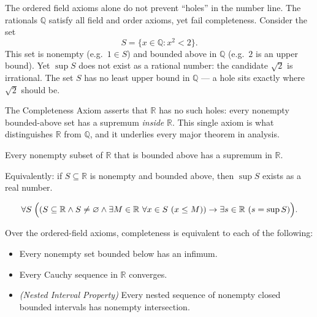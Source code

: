 \begin{remark*}
The ordered field axioms alone do not prevent ``holes'' in the number line.
The rationals $\mathbb{Q}$ satisfy all field and order axioms, yet fail
completeness. Consider the set
\[
S = \{x \in \mathbb{Q} : x^2 < 2\}.
\]
This set is nonempty (e.g.\ $1 \in S$) and bounded above in $\mathbb{Q}$
(e.g.\ $2$ is an upper bound). Yet $\sup S$ does not exist as a rational
number: the candidate $\sqrt{2}$ is irrational. The set $S$ has no least
upper bound in $\mathbb{Q}$ --- a hole sits exactly where $\sqrt{2}$ should be.

The Completeness Axiom asserts that $\mathbb{R}$ has no such holes:
every nonempty bounded-above set has a supremum \emph{inside} $\mathbb{R}$.
This single axiom is what distinguishes $\mathbb{R}$ from $\mathbb{Q}$,
and it underlies every major theorem in analysis.
\end{remark*}

\begin{tcolorbox}[colback=axiombox, colframe=axiomborder, arc=2pt,
  left=6pt, right=6pt, top=4pt, bottom=4pt,
  title={\small\textbf{Axiom (Completeness Axiom (Least Upper Bound Property))}},
  fonttitle=\small\bfseries]
Every nonempty subset of $\mathbb{R}$ that is bounded above has a supremum
in $\mathbb{R}$.

Equivalently: if $S \subseteq \mathbb{R}$ is nonempty and bounded above,
then $\sup S$ exists as a real number.
\end{tcolorbox}

\begin{remark*}
\[
\forall S\;\Bigl(
(S \subseteq \mathbb{R} \wedge S \neq \varnothing \wedge
\exists M \in \mathbb{R}\ \forall x \in S\ (x \le M))
\rightarrow
\exists s \in \mathbb{R}\ (s = \sup S)
\Bigr).
\]
\end{remark*}

\begin{remark*}
Over the ordered-field axioms, completeness is equivalent to each of the
following:
\begin{itemize}
  \item Every nonempty set bounded below has an infimum.
  \item Every Cauchy sequence in $\mathbb{R}$ converges.
  \item \emph{(Nested Interval Property)} Every nested sequence of nonempty
        closed bounded intervals has nonempty intersection.
\end{itemize}
\end{remark*}


